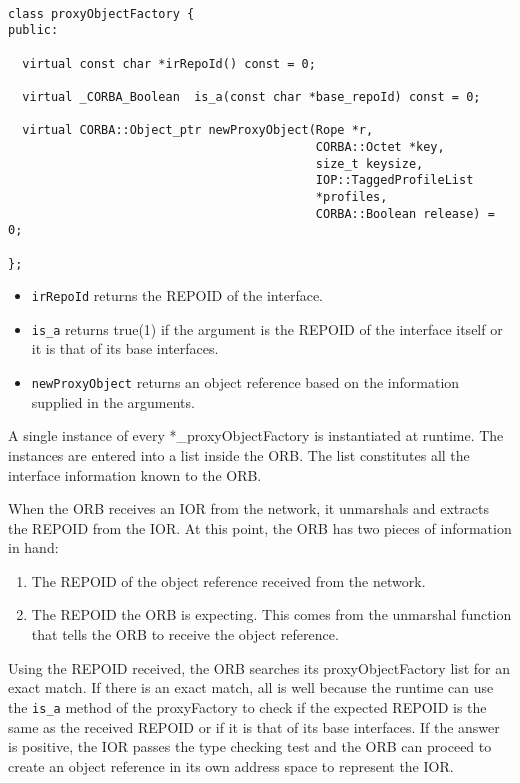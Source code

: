 \documentclass[11pt,twoside,onecolumn]{book}
\begin{document}
{\small
\begin{verbatim}

class proxyObjectFactory {
public:

  virtual const char *irRepoId() const = 0;

  virtual _CORBA_Boolean  is_a(const char *base_repoId) const = 0;
       
  virtual CORBA::Object_ptr newProxyObject(Rope *r,
                                           CORBA::Octet *key,
                                           size_t keysize,
                                           IOP::TaggedProfileList
                                           *profiles,
                                           CORBA::Boolean release) = 0;

};

\end{verbatim}
}

\begin{itemize}
\item {\tt irRepoId} returns the REPOID of the interface.
\item {\tt is\_a} returns true(1) if the argument is the REPOID of the
interface itself or it is that of its base interfaces.
\item {\tt newProxyObject} returns an object reference based on the
information supplied in the arguments.
\end{itemize}

A single instance of every *\_proxyObjectFactory is instantiated at runtime.
The instances are entered into a list inside the ORB. The list constitutes
all the interface information known to the ORB.

When the ORB receives an IOR from the network, it unmarshals and
extracts the REPOID from the IOR. At this point, the ORB has two pieces of
information in hand:

\begin{enumerate}
\item The REPOID of the object reference received from the network.
\item The REPOID the ORB is expecting. This comes from the unmarshal
      function that tells the ORB to receive the object reference.
\end{enumerate}

Using the REPOID received, the ORB searches its proxyObjectFactory list for
an exact match. If there is an exact match, all is well because the runtime
can use the {\tt is\_a} method of the proxyFactory to check if the expected
REPOID is the same as the received REPOID or if it is that of its base
interfaces. If the answer is positive, the IOR passes the type checking
test and the ORB can proceed to create an object reference in its own
address space to represent the IOR.
\end{document}

